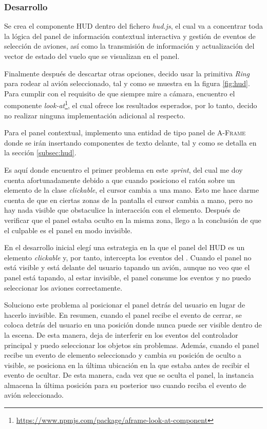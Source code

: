 \documentclass[a4paper, 11pt]{book}
\begin{document}
\subsubsection{Desarrollo}
Se crea el componente \textsc{\gls{HUD}} dentro del fichero \emph{hud.js}, el cual va a concentrar toda la lógica del panel de información contextual interactiva y gestión de eventos de selección de aviones, así como la transmisión de información y actualización del vector de estado del vuelo que se visualizan en el panel. 

Finalmente después de descartar otras opciones, decido usar la primitiva \emph{Ring} para rodear al avión seleccionado, tal y como se muestra en la figura \ref{fig:hud}. Para cumplir con el requisito de que siempre mire a cámara, encuentro el componente \emph{look-at}\footnote{\url{https://www.npmjs.com/package/aframe-look-at-component}}, el cual ofrece los resultados esperados, por lo tanto, decido no realizar ninguna implementación adicional al respecto.

Para el panel contextual, implemento una entidad de tipo panel de \textsc{A-Frame} donde se irán insertando componentes de texto delante, tal y como se detalla en la sección \ref{subsec:hud}. 

Es aquí donde encuentro el primer problema en este \emph{sprint}, del cual me doy  cuenta afortunadamente debido a que cuando posiciono el ratón sobre un elemento de la clase \emph{clickable}, el cursor cambia a una mano. Esto me hace darme cuenta de que en ciertas zonas de la pantalla el cursor cambia a mano, pero no hay nada visible que obstaculice la interacción con el elemento. Después de verificar que el panel estaba oculto en la misma zona, llego a la conclusión de que el culpable es el panel en modo invisible.

En el desarrollo inicial elegí una estrategia en la que el panel del \textsc{\gls{HUD}} es un elemento \emph{clickable} y, por tanto, intercepta los eventos del \emph{}. Cuando el panel no está visible y está delante del usuario tapando un avión, aunque no veo que el panel está tapando, al estar invisible, el panel consume los eventos y no puedo seleccionar los aviones correctamente.

Soluciono este problema al posicionar el panel detrás del usuario en lugar de hacerlo invisible. En resumen, cuando el panel recibe el evento de cerrar, se coloca detrás del usuario en una posición donde nunca puede ser visible dentro de la escena. De esta manera, deja de interferir en los eventos del controlador principal y puedo seleccionar los objetos sin problemas.
Además, cuando el panel recibe un evento de elemento seleccionado y cambia su posición de oculto a visible, se posiciona en la última ubicación en la que estaba antes de recibir el evento de ocultar. De esta manera, cada vez que se oculta el panel, la instancia almacena la última posición para su posterior uso cuando reciba el evento de avión seleccionado.
\end{document}
